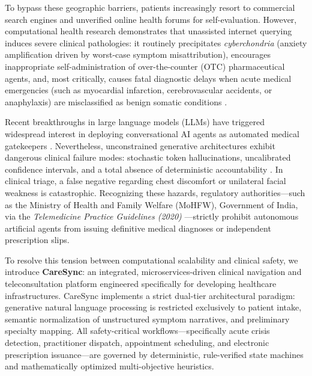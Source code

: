 \documentclass[conference]{IEEEtran}
\begin{document}
To bypass these geographic barriers, patients increasingly resort to commercial search engines and unverified online health forums for self-evaluation. However, computational health research demonstrates that unassisted internet querying induces severe clinical pathologies: it routinely precipitates \textit{cyberchondria} (anxiety amplification driven by worst-case symptom misattribution), encourages inappropriate self-administration of over-the-counter (OTC) pharmaceutical agents, and, most critically, causes fatal diagnostic delays when acute medical emergencies (such as myocardial infarction, cerebrovascular accidents, or anaphylaxis) are misclassified as benign somatic conditions \cite{wallace2022, chambers2019}.

Recent breakthroughs in large language models (LLMs) have triggered widespread interest in deploying conversational AI agents as automated medical gatekeepers \cite{milneives2020, singhal2023}. Nevertheless, unconstrained generative architectures exhibit dangerous clinical failure modes: stochastic token hallucinations, uncalibrated confidence intervals, and a total absence of deterministic accountability \cite{jeindl2022}. In clinical triage, a false negative regarding chest discomfort or unilateral facial weakness is catastrophic. Recognizing these hazards, regulatory authorities---such as the Ministry of Health and Family Welfare (MoHFW), Government of India, via the \textit{Telemedicine Practice Guidelines (2020)} \cite{mohfw2020}---strictly prohibit autonomous artificial agents from issuing definitive medical diagnoses or independent prescription slips.

To resolve this tension between computational scalability and clinical safety, we introduce \textbf{CareSync}: an integrated, microservices-driven clinical navigation and teleconsultation platform engineered specifically for developing healthcare infrastructures. CareSync implements a strict dual-tier architectural paradigm: generative natural language processing is restricted exclusively to patient intake, semantic normalization of unstructured symptom narratives, and preliminary specialty mapping. All safety-critical workflows---specifically acute crisis detection, practitioner dispatch, appointment scheduling, and electronic prescription issuance---are governed by deterministic, rule-verified state machines and mathematically optimized multi-objective heuristics.
\end{document}
